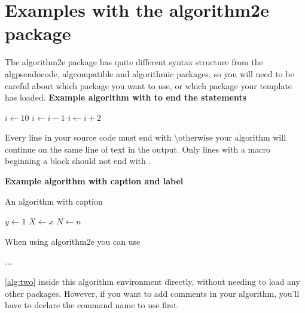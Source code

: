 \documentclass[11pt]{article}
\begin{document}
\section{Examples with the algorithm2e package}

The algorithm2e package has quite different syntax structure from the algpseudocode, algcompatible and algorithmic packages, so you will need to be careful about which package you want to use, or which package your template has loaded. 
\textbf{Example algorithm with  to end the statements}

\begin{algorithm}
$i\gets 10$\;
{
    $i\gets i-1$\;
}{
    {
        $i\gets i+2$\;
    }
}
\end{algorithm}
% 


Every line in your source code must end with \backslash \semicolon  otherwise your algorithm will continue on the same line of text in the output. Only lines with a macro beginning a block should not end with \;. 

\textbf{Example algorithm with caption and label}
\begin{algorithm}
\caption{An algorithm with caption}\label{alg:two}
$y \gets 1$\;
$X \gets x$\;
$N \gets n$\;
\end{algorithm}


When using algorithm2e you can use \caption{...}\ref{alg:two} inside this algorithm environment directly, without needing to load any other packages. However, if you want to add comments in your algorithm, you'll have to declare the command name to use first.
\end{document}
